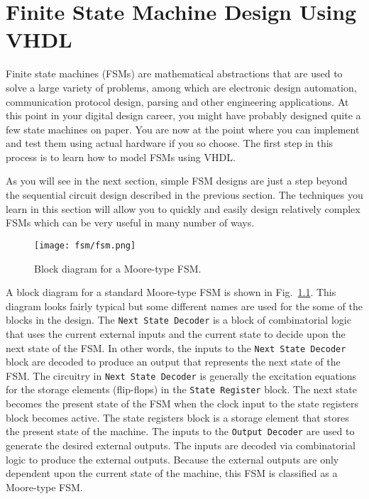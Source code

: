 %
%
%
\chapter{Finite State Machine Design Using VHDL}
Finite state machines (FSMs) are mathematical abstractions that are used to solve a large variety of problems, among which are electronic design automation, communication protocol design, parsing and other engineering applications. At this point in your digital design career, you might have probably designed quite a few state machines on paper. You are now at the point where you can implement and test them using actual hardware if you so choose. The first step in this process is to learn how to model FSMs using VHDL. 

As you will see in the next section, simple FSM designs are just a step beyond the sequential circuit design described in the previous section. The techniques you learn in this section will allow you to quickly and easily design relatively complex FSMs which can be very useful in many number of ways.

\begin{figure}
    \centering
	\texttt{[image: fsm/fsm.png]}
	\caption{Block diagram for a Moore-type FSM.}
	\label{fsm}
\end{figure}

A block diagram for a standard Moore-type FSM is shown in Fig.~\ref{fsm}. This diagram looks fairly typical but some different names are used for the some of the blocks in the design. The \texttt{Next State Decoder} is a block of combinatorial logic that uses the current external inputs and the current state to decide upon the next state of the FSM. In other words, the inputs to the \texttt{Next State Decoder} block are decoded to produce an output that represents the next state of the FSM. The circuitry in \texttt{Next State Decoder} is generally the excitation equations for the storage elements (flip-flops) in the \texttt{State Register} block. The next state becomes the present state of the FSM when the clock input to the state registers block becomes active. The state registers block is a storage element that stores the present state of the machine. The inputs to the \texttt{Output Decoder} are used to generate the desired external outputs. The inputs are decoded via combinatorial logic to produce the external outputs. Because the external outputs are only dependent upon the current state of the machine, this FSM is classified as a Moore-type FSM.

